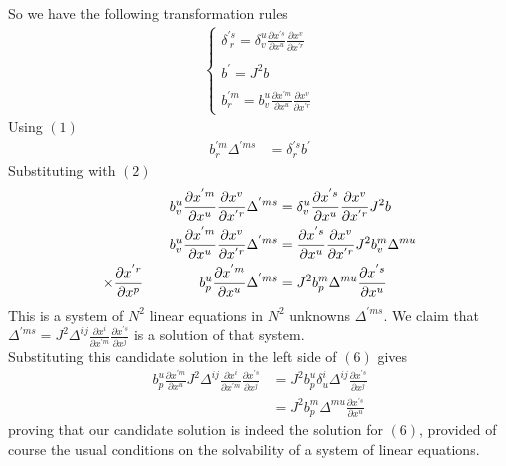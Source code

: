 So we have the following transformation rules
\begin{align}
\left\{\begin{array}{l}
\delta^{'s}_{\ r} =  \delta^{u}_v \frac{\partial x^{'s} }{\partial {x^u}}\frac{\partial x^{v} }{\partial x^{'r}}\\\\
b^{'}= J^2 b\\\\
b^{'m}_{r} = b^{u}_{v}\frac{\partial x^{'m} }{\partial {x^{u}}}\frac{\partial x^{v} }{\partial x^{'r}}
\end{array}\right.
\end{align}
Using $(1)$
\begin{align}
b^{'m}_{r}\Delta^{'ms}&=\delta^{'s}_r b^{'}
\end{align}
Substituting with $(2)$
\begin{align}
b^{u}_{v}\frac{\partial x^{'m} }{\partial {x^{u}}}\frac{\partial x^{v} }{\partial x^{'r}}\Delta^{'ms}&=\delta^{u}_v \frac{\partial x^{'s} }{\partial {x^u}}\frac{\partial x^{v} }{\partial x^{'r}} J^2 b\\
b^{u}_{v}\frac{\partial x^{'m} }{\partial {x^{u}}}\frac{\partial x^{v} }{\partial x^{'r}}\Delta^{'ms}&=\frac{\partial x^{'s} }{\partial {x^u}}\frac{\partial x^{v} }{\partial x^{'r}} J^2 b^{m}_{v}\Delta^{mu}\\
\times \frac{\partial x^{'r} }{\partial x^{p}}\quad\quad\quad\quad b^{u}_{p}\frac{\partial x^{'m} }{\partial {x^{u}}}\Delta^{'ms}&=J^2b^{m}_{p}\Delta^{mu}\frac{\partial x^{'s} }{\partial {x^u}}  
\end{align}
This is a system of $N^2$ linear equations in $N^2$ unknowns $\Delta^{'ms}$.  We claim that  $\Delta^{'ms}= J^2 \Delta^{ij}\frac{\partial x^{i} }{\partial {x^{'m}}}\frac{\partial x^{'s} }{\partial x^{j}}$ is a solution of that system.\\
Substituting this candidate solution in the left side of $(6)$ gives
\begin{align}
b^{u}_{p}\frac{\partial x^{'m} }{\partial {x^{u}}}J^2 \Delta^{ij}\frac{\partial x^{i} }{\partial {x^{'m}}}\frac{\partial x^{'s} }{\partial x^{j}}&=J^2b^{u}_{p}\delta^i_u\Delta^{ij}\frac{\partial x^{'s} }{\partial x^{j}}\\
&=J^2b^m_{p}\Delta^{mu}\frac{\partial x^{'s} }{\partial {x^u}}  
\end{align}
proving that our candidate solution is indeed the solution for $(6)$, provided of course the usual conditions on the solvability of a system of linear equations.\\
